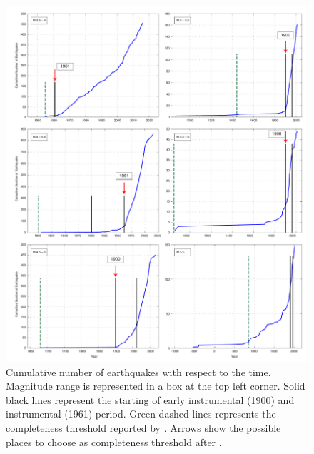 \begin{figure} [!ht]
\centering
\includegraphics[scale=0.4]{figures/pdf/completness_compare_zare_2014_Az_Al.pdf} 
\caption{Cumulative number of earthquakes with respect to the time. Magnitude range is represented in a box at the top left corner. Solid black lines represent the starting of early instrumental (1900) and instrumental (1961) period. Green dashed lines represents the completeness threshold reported by \citet{Zare2014}. Arrows show the possible places to choose as completeness threshold after \citet{Frankel1995}.}
\label{fig:completness_compare_zare_2014_Az_Al}
\end{figure}

